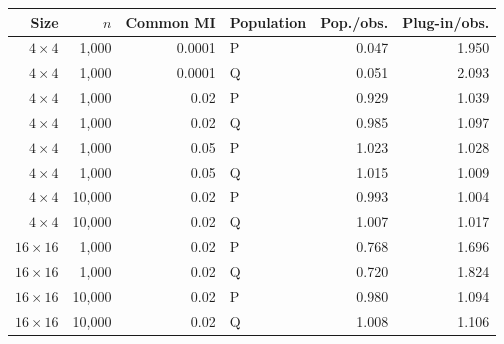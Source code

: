\begin{tabular}{@{}rrrlrr@{}}
\toprule
Size & \(n\) & Common MI & Population & Pop./obs. & Plug-in/obs.\\
\midrule
\(4\times4\) & 1,000 & 0.0001 & P & 0.047 & 1.950\\
\(4\times4\) & 1,000 & 0.0001 & Q & 0.051 & 2.093\\
\addlinespace[2pt]
\(4\times4\) & 1,000 & 0.02 & P & 0.929 & 1.039\\
\(4\times4\) & 1,000 & 0.02 & Q & 0.985 & 1.097\\
\addlinespace[2pt]
\(4\times4\) & 1,000 & 0.05 & P & 1.023 & 1.028\\
\(4\times4\) & 1,000 & 0.05 & Q & 1.015 & 1.009\\
\addlinespace[2pt]
\(4\times4\) & 10,000 & 0.02 & P & 0.993 & 1.004\\
\(4\times4\) & 10,000 & 0.02 & Q & 1.007 & 1.017\\
\addlinespace[2pt]
\(16\times16\) & 1,000 & 0.02 & P & 0.768 & 1.696\\
\(16\times16\) & 1,000 & 0.02 & Q & 0.720 & 1.824\\
\addlinespace[2pt]
\(16\times16\) & 10,000 & 0.02 & P & 0.980 & 1.094\\
\(16\times16\) & 10,000 & 0.02 & Q & 1.008 & 1.106\\
\bottomrule
\end{tabular}
